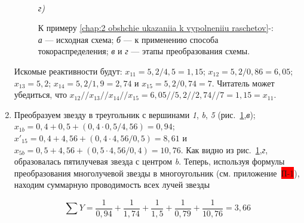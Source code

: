 \begin{small}
\begin{enumerate}
\begin{figure}[]
\begin{minipage}[]{0.4\linewidth}
			\end{minipage}
			\hfill
			\begin{minipage}[]{0.47\linewidth}
				 \\ \textit{г)}
			\end{minipage}
			\caption{К примеру \ref*{chap:2 obshchie ukazaniia k vypolneniiu raschetov}-: \textit{а} --- исходная схема; \textit{б} --- к применению способа токораспределения; \textit{в} и \textit{г} --- этапы преобразования схемы.}
			\label{ris:2-6 k_primeru_2-4}
		\end{figure}
		
		Искомые реактивности будут: $ x_{11} = 5,2 / 4,5 = 1,15 $; $ x_{12} = 5,2 / 0,86 = 6,05 $; $ x_{13} = 5,2 $; $ x_{14} = 5,2 / 1,9 = 2,74 $ и $ x_{15} = 5,2 / 0,74 = 7 $. Читатель может убедиться, что $ x_{12} // x_{13} // x_{14} // x_{15} = 6,05 // 5,2 // 2,74 // 7 = 1,15 = x_{11} $.
		
		\item Преобразуем звезду в треугольник с вершинами \textit{1}, \textit{b}, \textit{5} (рис.~\ref{ris:2-6 k_primeru_2-4},\textit{в}); $ x_{1b} = 0,4 + 0,5 + (0,4 \cdot 0,5/4,56) = 0,94 $; $ x'_{15} = 0,4 + 4,56 + (0,4 \cdot 4,56/0,5) = 8,61 $ и $ x_{5b} = 0,5 + 4,56 + (0,5 \cdot 4,56 / 0,4) = 10,76 $. Как видно из рис.~\ref{ris:2-6 k_primeru_2-4},\textit{г}, образовалась пятилучевая звезда с центром \textit{b}. Теперь, используя формулы преобразования многолучевой звезды в многоугольник (см. приложение~\colorbox{red}{П-1}), находим суммарную проводимость всех лучей звезды
		
		\begin{equation*}
			\sum Y = \frac{1}{0,94} + \frac{1}{1,74} + \frac{1}{1,5} + \frac{1}{0,79} + \frac{1}{10,76} = 3,66
		\end{equation*}
		

\end{enumerate}
\end{small}
